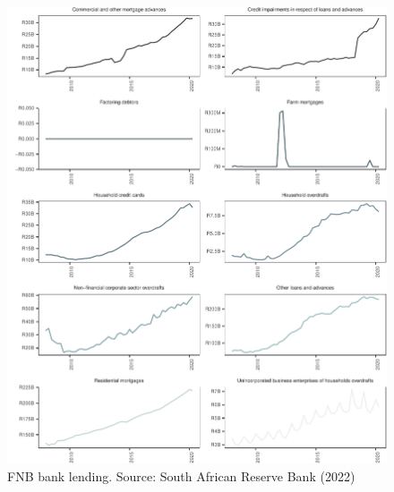 \documentclass[
]{article}
\begin{document}
\begin{figure}[H]

\includegraphics{Bank_capital_and_bank_lending_files/figure-latex/ba900fnb-1} \hfill{}

\caption{FNB bank lending. Source: South African Reserve Bank (2022) }\label{fig:ba900fnb}
\end{figure}
\end{document}
